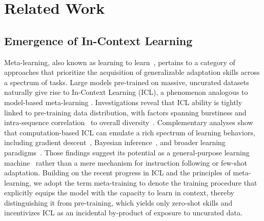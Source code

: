 \documentclass{article}
\begin{document}
\section{Related Work}
\subsection{Emergence of In-Context Learning}
Meta-learning, also known as learning to learn~\citep{thrun1998learning,finn2017model,duan2016rl}, pertains to a category of approaches that prioritize the acquisition of generalizable adaptation skills across a spectrum of tasks.
Large models pre-trained on massive, uncurated datasets naturally give rise to In-Context Learning (ICL), a phenomenon analogous to model-based meta-learning \citep{brown2020language, reed2022generalist, chen2021meta, coda2023meta, raparthy2024generalization, edelman2024evolution, liu2024llms}.
Investigations reveal that ICL ability is tightly linked to pre-training data distribution, with factors spanning burstiness and intra-sequence correlation~\citep{chan2022data,zhao2024analysing,raparthy2024generalization} to overall diversity~\citep{raventos2023pretraining}.
Complementary analyses show that computation-based ICL can emulate a rich spectrum of learning behaviors, including gradient descent~\citep{chan2022transformers,von2023transformers,xieexplanation}, Bayesian inference~\citep{xieexplanation}, and broader learning paradigms~\citep{laskin2022context}.
Those findings suggest its potential as a general-purpose learning machine~\citep{kirsch2022general,kirsch2023towards,wang2024benchmarking,wang2025putting} rather than a mere mechanism for instruction following or few-shot adaptation.
Building on the recent progress in ICL and the principles of meta-learning, we adopt the term meta-training to denote the training procedure that explicitly equips the model with the capacity to learn in context, thereby distinguishing it from pre-training, which yields only zero-shot skills and incentivizes ICL as an incidental by-product of exposure to uncurated data.
\end{document}
